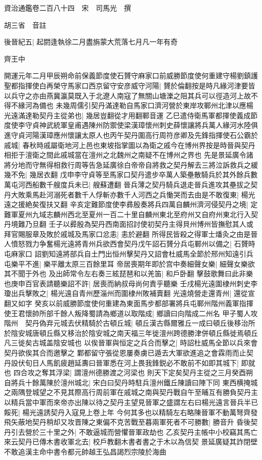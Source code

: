 資治通鑑卷二百八十四　宋　司馬光　撰

胡三省　音註

後晉紀五|{
	起閼逢執徐二月盡旃蒙大荒落七月凡一年有奇}


齊王中

開運元年二月甲辰朔命前保義節度使石贇守麻家口前威勝節度使何重建守楊劉鎮護聖都指揮使白再榮守馬家口西京留守安彦威守河陽|{
	贇於倫翻按是時凡緣河津要皆以兵守之亦由燕冀瀛莫既入于北遼人南寇了無關山塘濼之阻其兵可以徑造河上故不得不緣河為備也}
未幾周儒引契丹滿達勒自馬家口濟河營於東岸攻鄆州北津以應楊光遠滿達勒契丹主從弟也|{
	幾居豈翻從才用翻鄆音運}
乙巳遣侍衛馬軍都揮使義成節度使李守貞神武統軍皇甫遇陳州防禦使梁漢璋懷州刺史薛懷讓將兵萬人緣河水陸俱進守貞河陽漢璋應州懷讓太原人也丙午契丹圍高行周符彦卿及先鋒指揮使石公霸於戚城|{
	春秋時戚屬衛地河上邑也東坡指掌圖以為衛之戚今在博州界按是時晉與契丹相拒于澶衛之間此戚城當在澶州之北魏州之南疑不在博州之界也}
先是景延廣令諸將分地而守無得相救行周等告急延廣徐白帝帝自將救之契丹解去三將泣訴救兵之緩幾不免|{
	幾居衣翻}
戊申李守貞等至馬家口契丹遣步卒萬人築壘散騎兵於其外餘兵數萬屯河西船數千艘度兵未已|{
	艘蘇遭翻}
晉兵薄之契丹騎兵退走晉兵進攻其壘拔之契丹大敗乘馬赴河溺死者數千人俘斬亦數千人河西之兵慟哭而去由是不敢復東|{
	楊光遠之援絶矣復扶又翻}
辛亥定難節度使李彞殷奏將兵四萬自麟州濟河侵契丹之境|{
	定難軍夏州九域志麟州西北至夏州一百二十里自麟州東北至府州又自府州東北行入契丹境難乃旦翻}
壬子以彛殷為契丹西南面招討使初契丹主得貝州博州皆撫慰其人或拜官賜服章及敗於戚城及馬家口忿恚|{
	恚於避翻}
所得民皆殺之得軍士燔灸之由是晉人憤怒戮力争奮楊光遠將青州兵欲西會契丹戊午詔石贇分兵屯鄆州以備之|{
	石贇時屯麻家口}
詔劉知遠將部兵自土門出恒州擊契丹又詔會杜威馬全節於邢州知遠引兵屯樂平不進|{
	樂平離太原三百餘里耳}
帝居喪期年即於宫中奏細聲女樂|{
	細聲女樂欲其不聞于外也}
及出師常令左右奏三絃琵琶和以羌笛|{
	和戶卧翻}
擊鼓歌舞曰此非樂也庚申百官表請聽樂詔不許|{
	居喪而納叔母尚何責乎聽樂}
壬戌楊光遠圍棣州刺史李瓊出兵擊敗之|{
	楊光遠自青州歷淄州而圍棣州敗補賣翻}
光遠燒營走還青州|{
	還從宣翻又如字}
癸亥以前威勝節度使何重建為東面馬步都部署將兵屯鄆州階州義軍指揮使王君懷帥所部千餘人叛降蜀請為鄉道以取階成|{
	鄉讀曰向階成二州名}
甲子蜀人攻階州　契丹偽弃元城去伏精騎於古頓丘城|{
	頓丘漢古縣爾雅丘一成曰頓丘後移治所於陰安城唐頓丘縣又移治於陰安城之南天福三年徙澶州跨德勝津併頓丘縣徙焉頓丘凡三徙矣古城盖陰安城也}
以俟晉軍與恒定之兵合而擊之|{
	時詔杜威馬全節以兵來會契丹欲俟其合而邀擊之}
鄴都留守張從恩屢奏虜已遁去大軍欲進追之會霖雨而止契丹設伏旬日人馬飢疲趙延夀曰晉軍悉在河上畏我鋒鋭必不敢前不如即其城下|{
	即就也}
四合攻之奪其浮梁|{
	謂澶州德勝渡之河梁也}
則天下定矣契丹主從之三月癸酉朔自將兵十餘萬陳於澶州城北|{
	宋白曰契丹時駐兵澶州鐵丘陳讀曰陣下同}
東西横掩城之兩隅登城望之不見其際高行周前軍在戚城之南與契丹戰自午至晡互有勝負契丹主以精兵當中軍而來帝亦出陳以待之契丹主望見晉軍之盛謂左右曰楊光遠言晉兵半已餒死|{
	楊光遠誘契丹入寇見上卷上年}
今何其多也以精騎左右略陳晉軍不動萬弩齊發飛矢蔽地契丹稍却又攻晋陳之東偏不克苦戰至暮兩軍死者不可勝數|{
	勝音升}
昏後契丹引去營於三十里之外|{
	不敢逼城而營懼晉軍政劫也}
乙亥契丹主帳中小校竊其馬亡來云契丹已傳木書收軍北去|{
	校戶教翻木書者書之于木以為信契}
景延廣疑其詐閉壁不敢追漢主命中書令都元帥越王弘昌謁烈宗陵於海曲

